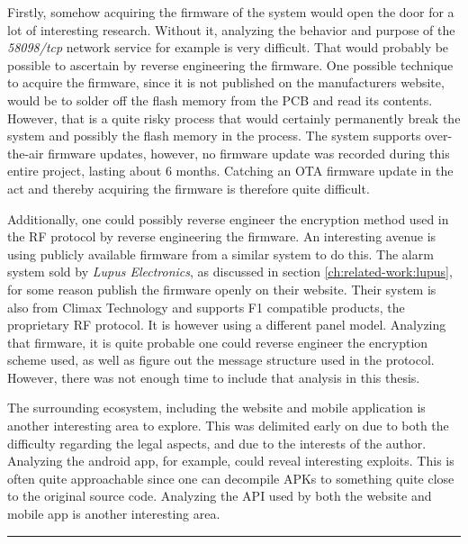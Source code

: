 Firstly, somehow acquiring the firmware of the system would open the door for a lot of interesting research. Without it, analyzing the behavior and purpose of the \textit{58098/tcp} network service for example is very difficult. That would probably be possible to ascertain by reverse engineering the firmware. One possible technique to acquire the firmware, since it is not published on the manufacturers website, would be to solder off the flash memory from the PCB and read its contents. However, that is a quite risky process that would certainly permanently break the system and possibly the flash memory in the process. The system supports over-the-air firmware updates, however, no firmware update was recorded during this entire project, lasting about 6 months. Catching an OTA firmware update in the act and thereby acquiring the firmware is therefore quite difficult.

Additionally, one could possibly reverse engineer the encryption method used in the RF protocol by reverse engineering the firmware. An interesting avenue is using publicly available firmware from a similar system to do this. The alarm system sold by \textit{Lupus Electronics}, as discussed in section \ref{ch:related-work:lupus}, for some reason publish the firmware openly on their website. Their system is also from Climax Technology and supports F1 compatible products, the proprietary RF protocol. It is however using a different panel model. Analyzing that firmware, it is quite probable one could reverse engineer the encryption scheme used, as well as figure out the message structure used in the protocol. However, there was not enough time to include that analysis in this thesis.

The surrounding ecosystem, including the website and mobile application is another interesting area to explore. This was delimited early on due to both the difficulty regarding the legal aspects, and due to the interests of the author. Analyzing the android app, for example, could reveal interesting exploits. This is often quite approachable since one can decompile APKs to something quite close to the original source code. Analyzing the API used by both the website and mobile app is another interesting area.

\noindent\rule{\textwidth}{0.4mm}
